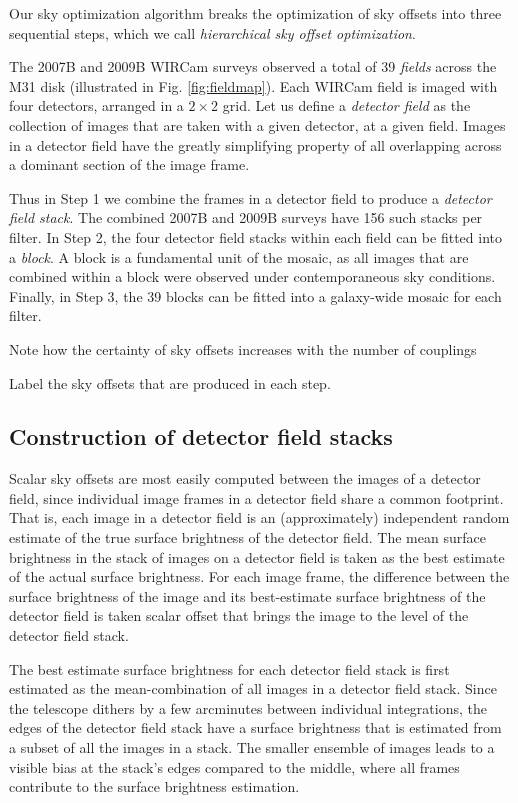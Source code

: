 \documentclass[iop]{emulateapj}
\newcommand{\todo}[1]{\textcolor{RedOrange}{#1}} %
\begin{document}
Our sky optimization algorithm breaks the optimization of sky offsets into three sequential steps, which we call \emph{hierarchical sky offset optimization}.

The 2007B and 2009B WIRCam surveys observed a total of 39 \emph{fields} across the M31 disk (illustrated in Fig. \ref{fig:fieldmap}). Each WIRCam field is imaged with four detectors, arranged in a $2\times 2$ grid. Let us define a \emph{detector field} as the collection of images that are taken with a given detector, at a given field. Images in a detector field have the greatly simplifying property of all overlapping across a dominant section of the image frame.

Thus in Step 1 we combine the frames in a detector field to produce a \emph{detector field stack}. The combined 2007B and 2009B surveys have 156 such stacks per filter. In Step 2, the four detector field stacks within each field can be fitted into a \emph{block}. A block is a fundamental unit of the mosaic, as all images that are combined within a block were observed under contemporaneous sky conditions. Finally, in Step 3, the 39 blocks can be fitted into a galaxy-wide mosaic for each filter.

\todo{Note how the certainty of sky offsets increases with the number of couplings}

\todo{Label the sky offsets that are produced in each step.}

\subsection{Construction of detector field stacks}
\label{sec:stacks}

Scalar sky offsets are most easily computed between the images of a detector field, since individual image frames in a detector field share a common footprint. That is, each image in a detector field is an (approximately) independent random estimate of the true surface brightness of the detector field. The mean surface brightness in the stack of images on a detector field is taken as the best estimate of the actual surface brightness. For each image frame, the difference between the surface brightness of the image and its best-estimate surface brightness of the detector field is taken scalar offset that brings the image to the level of the detector field stack.

The best estimate surface brightness for each detector field stack is first estimated as the mean-combination of all images in a detector field stack.  Since the telescope dithers by a few arcminutes between individual integrations, the edges of the detector field stack have a surface brightness that is estimated from a subset of all the images in a stack. The smaller ensemble of images leads to a visible bias at the stack's edges compared to the middle, where all frames contribute to the surface brightness estimation.
\end{document}
